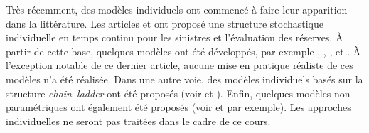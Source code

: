 Très récemment, des modèles individuels ont commencé à faire leur
apparition dans la littérature. Les articles \citet{Arjas} et
\citet{Norberg, Norberg99} ont proposé une structure stochastique
individuelle en temps continu pour les sinistres et l'évaluation des
réserves. À partir de cette base, quelques modèles ont été développés,
par exemple \citet{Haastrup}, \citet{Lars07}, \citet{Zhao09},
\citet{ZhaoIME2} et \citet{AntonioPlat}. À l'exception notable de ce
dernier article, aucune mise en pratique réaliste de ces modèles n'a
été réalisée. Dans une autre voie, des modèles individuels basés sur
la structure \emph{chain--ladder} ont été proposés (voir
\citet{PigAntDen2013} et \citet{PigAntDen2014}). Enfin, quelques
modèles non-paramétriques ont également été proposés (voir
\citet{Drieskens} et \citet{Rosenlund} par exemple). Les approches
individuelles ne seront pas traitées dans le cadre de ce cours.

